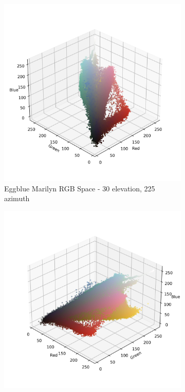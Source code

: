 \documentclass{article}
\begin{document}
\begin{figure}[ht]\ContinuedFloat
  \centering
  \begin{subfigure}{0.45\textwidth}
    \includegraphics[width=\textwidth]{main_files/figure-latex/4_19_eggblue_marilyn_original_scatter.jpg}
    \caption{Eggblue Marilyn RGB Space - 30 \degree elevation, 225 \degree azimuth}
    \label{fig:4_19_eggblue_marilyn_original_scatter}
  \end{subfigure}
  \hfill
  \begin{subfigure}{0.45\textwidth}
    \includegraphics[width=\textwidth]{main_files/figure-latex/4_20_eggblue_marilyn_original_scatter.jpg}

\end{subfigure}
\end{figure}
\end{document}
